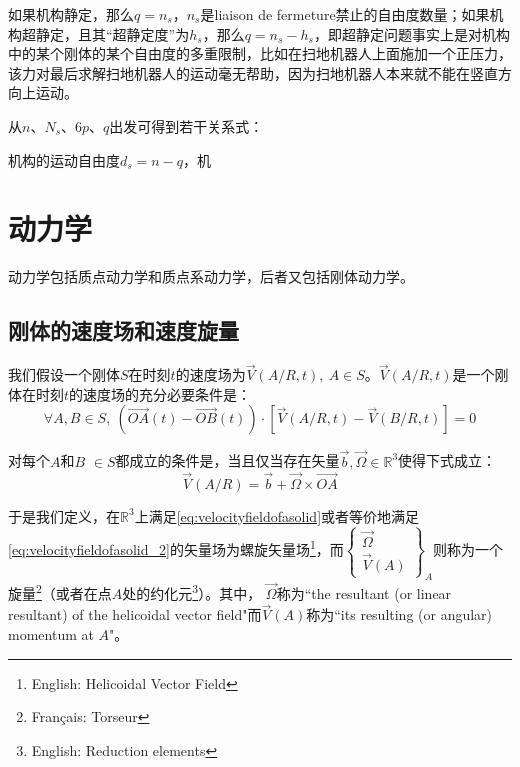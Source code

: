 \documentclass[UTF8]{ctexart}%
\begin{document}
如果机构静定，那么$q=n_s$，$n_s$是liaison de fermeture禁止的自由度数量；如果机构超静定，且其“超静定度”为$h_s$，那么$q=n_s-h_s$，即超静定问题事实上是对机构中的某个刚体的某个自由度的多重限制，比如在扫地机器人上面施加一个正压力，该力对最后求解扫地机器人的运动毫无帮助，因为扫地机器人本来就不能在竖直方向上运动。

从$n$、$N_s$、$6p$、$q$出发可得到若干关系式：

机构的运动自由度$d_s=n-q$，机


\section{动力学}
\label{sec:动力学}
动力学包括质点动力学和质点系动力学，后者又包括刚体动力学。

\subsection{刚体的速度场和速度旋量}
\label{sec:刚体的速度场和速度旋量}
我们假设一个刚体$S$在时刻$t$的速度场为$\overrightarrow{V}\left(A/R,t\right),\ A\in S$。$\overrightarrow{V}\left(A/R,t\right)$是一个刚体在时刻$t$的速度场的充分必要条件是\cite{temam_mathematical_2005}：
\begin{equation}
\forall A, B \in S,\ \left(\overrightarrow{OA}\left(t\right)-\overrightarrow{OB}\left(t\right)\right)\cdot [\overrightarrow{V}\left(A/R,t\right)-\overrightarrow{V}\left(B/R,t\right)]=0
\label{eq:velocityfieldofasolid}
\end{equation}

对每个$A$和$B$ $\in S$都成立的条件是，当且仅当存在矢量$\overrightarrow{b},\overrightarrow{\Omega}\in \mathbb{R}^3$使得下式成立：
\begin{equation}
\overrightarrow{V}\left(A/R\right)=\overrightarrow{b}+\overrightarrow{\Omega}\times\overrightarrow{OA}
\label{eq:velocityfieldofasolid_2}
\end{equation}

于是我们定义，在$\mathbb{R}^3$上满足\cref{eq:velocityfieldofasolid}或者等价地满足\cref{eq:velocityfieldofasolid_2}的矢量场为螺旋矢量场\footnote{English: Helicoidal Vector Field}，而$\left\{\begin{matrix}
  \overrightarrow{\Omega} \\
  \overrightarrow{V}\left(A\right) 
 \end{matrix} \right\}_A$则称为一个旋量\footnote{Français: Torseur}（或者在点$A$处的约化元\footnote{English: Reduction elements}）。其中， $\overrightarrow{\Omega}$称为``the resultant (or linear resultant) of the helicoidal vector field"而$\overrightarrow{V}\left(A\right)$称为``its resulting (or angular) momentum at $A$"\cite{temam_mathematical_2005}。
 
\end{document}
